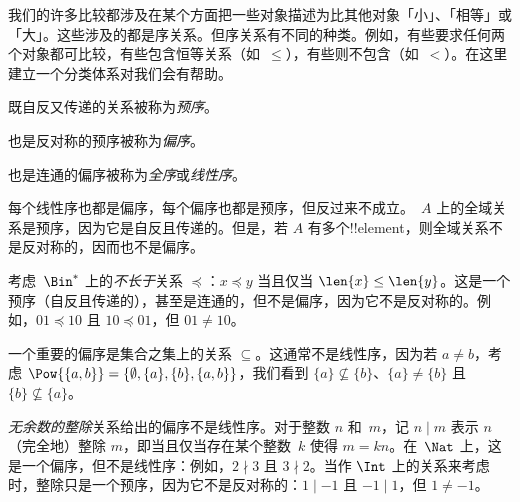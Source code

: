 \documentclass[../../../include/open-logic-section]{subfiles}
\begin{document}

\begin{explain}
我们的许多比较都涉及在某个方面把一些对象描述为比其他对象「小」、「相等」或「大」。这些涉及的都是序关系。但序关系有不同的种类。例如，有些要求任何两个对象都可比较，有些包含恒等关系（如~$\le$），有些则不包含（如~$<$）。在这里建立一个分类体系对我们会有帮助。
\end{explain}

\begin{defn}[预序]
既自反又传递的关系被称为\emph{预序}。
\end{defn}

\begin{defn}[偏序]
也是反对称的预序被称为\emph{偏序}。
\end{defn}

\begin{defn}[线性序]
也是连通的偏序被称为\emph{全序}或\emph{线性序}。
\end{defn}

\begin{ex}
每个线性序也都是偏序，每个偏序也都是预序，但反过来不成立。~$A$ 上的全域关系是预序，因为它是自反且传递的。但是，若 $A$ 有多个!!{element}，则全域关系不是反对称的，因而也不是偏序。
\end{ex}

\begin{ex}
考虑~$\Bin^*$ 上的\emph{不长于}关系 $\preccurlyeq$：$x \preccurlyeq y$ 当且仅当 $\len{x} \le \len{y}$。这是一个预序（自反且传递的），甚至是连通的，但不是偏序，因为它不是反对称的。例如，$01 \preccurlyeq 10$ 且 $10 \preccurlyeq 01$，但 $01 \neq 10$。
\end{ex}

\begin{ex}
一个重要的偏序是集合之集上的关系 $\subseteq$。这通常不是线性序，因为若 $a \neq b$，考虑 $\Pow{\{a, b\}} = \{\emptyset, \{a\}, \{b\}, \{a,b\}\}$，我们看到 $\{a\} \nsubseteq \{b\}$、$\{a\} \neq \{b\}$ 且 $\{b\} \nsubseteq \{a\}$。
\end{ex}

\begin{ex}
\emph{无余数的整除}关系给出的偏序不是线性序。对于整数 $n$ 和~$m$，记 $n \mid m$ 表示 $n$（完全地）整除 $m$，即当且仅当存在某个整数~$k$ 使得 $m = kn$。在~$\Nat$ 上，这是一个偏序，但不是线性序：例如，$2 \nmid 3$ 且 $3 \nmid 2$。当作 $\Int$ 上的关系来考虑时，整除只是一个预序，因为它不是反对称的：$1 \mid -1$ 且 $-1 \mid 1$，但 $1 \neq -1$。
\end{ex}
\end{document}
